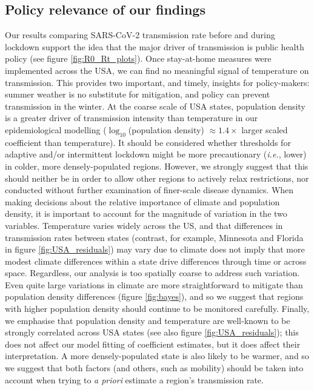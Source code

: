 \documentclass[12pt,english,a4paper]{article}
\newcommand{\virus}{SARS-CoV-2\xspace}
\begin{document}
\subsection*{Policy relevance of our findings}
Our results comparing \virus transmission rate before and during lockdown support the idea that the major driver of transmission is public health policy \cite{Flaxman2020a, Jarvis2020, Lau2020} (see figure \ref{fig:R0_Rt_plots}). Once stay-at-home measures were implemented across the USA, we can find no meaningful signal of temperature on transmission. This provides two important, and timely, insights for policy-makers: summer weather is no substitute for mitigation, and policy can prevent transmission in the winter. 
At the coarse scale of USA states, population density is a greater driver of transmission intensity than temperature in our epidemiological modelling ($\log_{10}$(population density) $\approx 1.4 \times$ larger scaled coefficient than temperature). 
It should be considered whether thresholds for adaptive and/or intermittent lockdown might be more precautionary (\emph{i.e.}, lower) in colder, more densely-populated regions. However, we strongly suggest that this should neither be in order to allow other regions to actively relax restrictions, nor conducted without further examination of finer-scale disease dynamics. When making decisions about the relative importance of climate and population density, it is important to account for the magnitude of variation in the two variables. 
Temperature varies widely across the US, and that differences in transmission rates between states (contrast, for example, Minnesota and Florida in figure \ref{fig:USA_residuals}) may vary due to climate does not imply that more modest climate differences within a state drive differences through time or across space.
Regardless, our analysis is too spatially coarse to address such variation. Even quite large variations in climate are more straightforward to mitigate than population density differences (figure \ref{fig:bayes}), and so we suggest that regions with higher population density should continue to be monitored carefully. Finally, we emphasise that population density and temperature are well-known to be strongly correlated across USA states (see also figure \ref{fig:USA_residuals}); this does not affect our model fitting of coefficient estimates, but it does affect their interpretation. A more densely-populated state is also likely to be warmer, and so we suggest that both factors (and others, such as mobility) should be taken into account when trying to \emph{a priori} estimate a region's transmission rate. 
\end{document}
